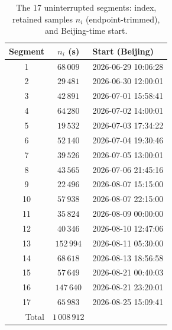 \documentclass[11pt,a4paper]{article}
\begin{document}
\begin{table}[t]
  \centering
  \caption{The 17 uninterrupted segments: index, retained samples $n_i$
  (endpoint-trimmed), and Beijing-time start.}
  \label{tab:segments}
  \begin{tabular}{ccl}
    \toprule
    Segment & $n_i$ (s) & Start (Beijing) \\
    \midrule
    1  & $68\,009$  & 2026-06-29 10:06:28 \\
    2  & $29\,481$  & 2026-06-30 12:00:01 \\
    3  & $42\,891$  & 2026-07-01 15:58:41 \\
    4  & $64\,280$  & 2026-07-02 14:00:01 \\
    5  & $19\,532$  & 2026-07-03 17:34:22 \\
    6  & $52\,140$  & 2026-07-04 19:30:46 \\
    7  & $39\,526$  & 2026-07-05 13:00:01 \\
    8  & $43\,565$  & 2026-07-06 21:45:16 \\
    9  & $22\,496$  & 2026-08-07 15:15:00 \\
    10 & $57\,938$  & 2026-08-07 22:15:00 \\
    11 & $35\,824$  & 2026-08-09 00:00:00 \\
    12 & $40\,346$  & 2026-08-10 12:47:06 \\
    13 & $152\,994$ & 2026-08-11 05:30:00 \\
    14 & $68\,618$  & 2026-08-13 18:56:58 \\
    15 & $57\,649$  & 2026-08-21 00:40:03 \\
    16 & $147\,640$ & 2026-08-21 23:20:01 \\
    17 & $65\,983$  & 2026-08-25 15:09:41 \\
    \midrule
    \multicolumn{1}{r}{Total} & $1\,008\,912$ & \\
    \bottomrule
  \end{tabular}
\end{table}

\end{document}
